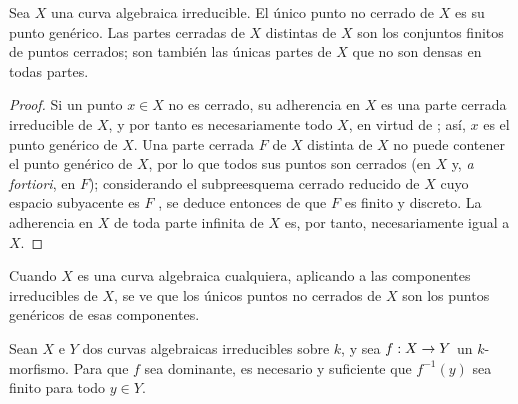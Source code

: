 \documentclass[oneside,10pt]{amsart}
\makeatletter
\newcommand{\ega@arrow}[2]{\mathchoice{#1}{#2}{#2}{#2}}
\renewcommand{\to}{\ega@arrow{\longrightarrow}{\rightarrow}}
\newcommand{\oldpage}[2][]{\marginnote{\normalfont\footnotesize\textbf{#1}~|~#2}\ignorespaces}
\let\EGAOriginalLabel\label
\renewcommand{\label}[1]{\phantomsection\EGAOriginalLabel{#1}}
\makeatother
\begin{document}
\begin{corollary}[7.4.3]
\label{II.7.4.3-fr}
Sea $X$ una curva algebraica irreducible.
El único punto no cerrado de $X$ es su punto genérico.
Las partes cerradas de $X$ distintas de $X$ son los conjuntos finitos de puntos cerrados;
son también las únicas partes de $X$ que no son densas en todas partes.
\end{corollary}

\begin{proof}
Si un punto $x\in X$ no es cerrado, su adherencia en $X$ es una parte cerrada irreducible de $X$, y por tanto es necesariamente todo $X$, en virtud de ; así, $x$ es el punto genérico de $X$.
Una parte cerrada $F$ de $X$ distinta de $X$ no puede contener
\oldpage[II]{149}
el punto genérico de $X$, por lo que todos sus puntos son cerrados (en $X$ y, \emph{a fortiori}, en $F$);
considerando el subpreesquema cerrado reducido de $X$ cuyo espacio subyacente es $F$ , se deduce entonces de  que $F$ es finito y discreto.
La adherencia en $X$ de toda parte infinita de $X$ es, por tanto, necesariamente igual a $X$.
\end{proof}

Cuando $X$ es una curva algebraica cualquiera, aplicando  a las componentes irreducibles de $X$, se ve que los únicos puntos no cerrados de $X$ son los puntos genéricos de esas componentes.

\begin{corollary}[7.4.4]
\label{II.7.4.4-fr}
Sean $X$ e $Y$ dos curvas algebraicas irreducibles sobre $k$, y sea $f:X\to Y$ un $k$-morfismo.
Para que $f$ sea dominante, es necesario y suficiente que $f^{-1}(y)$ sea finito para todo $y\in Y$.
\end{corollary}
\end{document}
